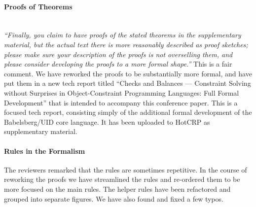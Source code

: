 \documentclass[10pt,twocolumn]{article}
\begin{document}
\paragraph{Proofs of Theorems}~\\
\emph{``Finally, you claim to have proofs of the stated theorems in
  the supplementary material, but the actual text there is more
  reasonably described as proof sketches; please make sure your
  description of the proofs is not overselling them, and please
  consider developing the proofs to a more formal shape.''} This is a
fair comment.  We have reworked the proofs to be substantially more
formal, and have put them in a new tech report titled ``Checks and
Balances --- Constraint Solving without Surprises in Object-Constraint
Programming Languages: Full Formal Development'' that is intended to
accompany this conference paper.  This is a focused tech report,
consisting simply of the additional formal development of the
Babelsberg/UID core language.  It has been uploaded to HotCRP as
supplementary material.

\paragraph{Rules in the Formalism}
The reviewers remarked that the rules are sometimes repetitive. In the
course of reworking the proofs we have streamlined the rules and
re-ordered them to be more focused on the main rules. The helper rules
have been refactored and grouped into separate figures. We have also
found and fixed a few typos.




\end{document}
